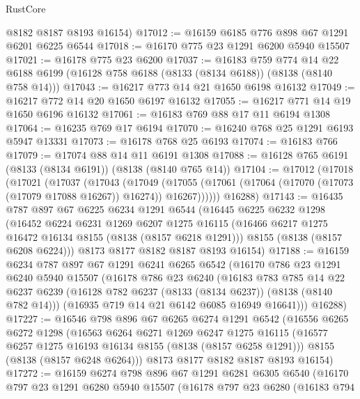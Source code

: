 \begin{lexlean}{RustCore}
\begin{coremodule}
      @8182
      @8187
      @8193
      @16154)
@17012 := @16159 @6185 @776 @898 @67 @1291 @6201 @6225 @6544
@17018 := @16170 @775 @23 @1291 @6200 @5940 @15507
@17021 := @16178 @775 @23 @6200
@17037 := @16183
    @759
    @774
    @14
    @22
    @6188
    @6199
    (@16128 @758 @6188 (@8133 (@8134 @6188)) (@8138 (@8140 @758 @14)))
@17043 := @16217 @773 @14 @21 @1650 @6198 @16132
@17049 := @16217 @772 @14 @20 @1650 @6197 @16132
@17055 := @16217 @771 @14 @19 @1650 @6196 @16132
@17061 := @16183 @769 @88 @17 @11 @6194 @1308
@17064 := @16235 @769 @17 @6194
@17070 := @16240 @768 @25 @1291 @6193 @5947 @13331
@17073 := @16178 @768 @25 @6193
@17074 := @16183 @766
@17079 := @17074 @88 @14 @11 @6191 @1308
@17088 := @16128 @765 @6191 (@8133 (@8134 @6191)) (@8138 (@8140 @765 @14))
@17104 := @17012
    (@17018
      (@17021
        (@17037
          (@17043
            (@17049
              (@17055 (@17061 (@17064 (@17070 (@17073 (@17079 @17088 @16267)) @16274)) @16267))))))
      @16288)
@17143 := @16435
    @787
    @897
    @67
    @6225
    @6234
    @1291
    @6544
    (@16445
      @6225
      @6232
      @1298
      (@16452
        @6224
        @6231
        @1269
        @6207
        @1275
        @16115
        (@16466 @6217 @1275 @16472 @16134 @8155 (@8138 (@8157 @6218 @1291)))
        @8155
        (@8138 (@8157 @6208 @6224)))
      @8173
      @8177
      @8182
      @8187
      @8193
      @16154)
@17188 := @16159
    @6234
    @787
    @897
    @67
    @1291
    @6241
    @6265
    @6542
    (@16170
      @786
      @23
      @1291
      @6240
      @5940
      @15507
      (@16178
        @786
        @23
        @6240
        (@16183
          @783
          @785
          @14
          @22
          @6237
          @6239
          (@16128 @782 @6237 (@8133 (@8134 @6237)) (@8138 (@8140 @782 @14)))
          (@16935 @719 @14 @21 @6142 @6085 @16949 @16641)))
      @16288)
@17227 := @16546
    @798
    @896
    @67
    @6265
    @6274
    @1291
    @6542
    (@16556
      @6265
      @6272
      @1298
      (@16563
        @6264
        @6271
        @1269
        @6247
        @1275
        @16115
        (@16577 @6257 @1275 @16193 @16134 @8155 (@8138 (@8157 @6258 @1291)))
        @8155
        (@8138 (@8157 @6248 @6264)))
      @8173
      @8177
      @8182
      @8187
      @8193
      @16154)
@17272 := @16159
    @6274
    @798
    @896
    @67
    @1291
    @6281
    @6305
    @6540
    (@16170
      @797
      @23
      @1291
      @6280
      @5940
      @15507
      (@16178
        @797
        @23
        @6280
        (@16183
          @794

\end{coremodule}
\end{lexlean}
